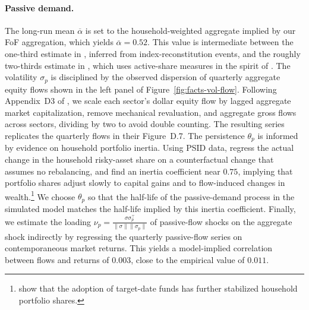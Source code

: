 \documentclass[12pt,english]{article}
\begin{document}
\paragraph{Passive demand.}
The long-run mean $\overline{\alpha}$ is set to the household-weighted aggregate implied by our FoF aggregation, which yields $\overline{\alpha}=0.52$.
This value is intermediate between the one-third estimate in \citet{chinco2024passive}, inferred from index-reconstitution events, and the roughly two-thirds estimate in \citet{koijen2024investors}, which uses active-share measures in the spirit of \citet{cremers2009active}.
The volatility $\sigma_p$ is disciplined by the observed dispersion of quarterly aggregate equity flows shown in the left panel of Figure~\ref{fig:facts-vol-flow}.
Following Appendix~D3 of \citet{gabaix2020search}, we scale each sector's dollar equity flow by lagged aggregate market capitalization, remove mechanical revaluation, and aggregate gross flows across sectors, dividing by two to avoid double counting.
The resulting series replicates the quarterly flows in their Figure~D.7.
The persistence $\theta_p$ is informed by evidence on household portfolio inertia.
Using PSID data, \citet{brunnermeier2008wealth} regress the actual change in the household risky-asset share on a counterfactual change that assumes no rebalancing, and find an inertia coefficient near $0.75$, implying that portfolio shares adjust slowly to capital gains and to flow-induced changes in wealth.\footnote{\citet{parker2023retail} show that the adoption of target-date funds has further stabilized household portfolio shares.}
We choose $\theta_p$ so that the half-life of the passive-demand process in the simulated model matches the half-life implied by this inertia coefficient.
Finally, we estimate the loading $\nu_p = \frac{\sigma \sigma_p^\top}{\|\sigma\| \|\sigma_p\|}$ of passive-flow shocks on the aggregate shock indirectly by regressing the quarterly passive-flow series on contemporaneous market returns.
This yields a model-implied correlation between flows and returns of $0.003$, close to the empirical value of $0.011$.

\begin{table}[!t]
    \centering
    \resizebox{.8\linewidth}{!}{}
    \vspace{2mm}
    \captionsetup{font=footnotesize}
    \caption{\textbf{Unconditional moments.}\\
    This table reports model-implied and empirical unconditional moments for the dividend claim and the endowment claim in the baseline economy.
    Model moments are computed from a $1{,}000$-year monthly simulation of the calibrated economy.
    The price impact is estimated as the slope coefficient $\hat{b}_1$ of the regression $\Delta\log(P/D)_t = a_0 + b_1\,\overline{\alpha}_{p,t}^{s}\,x_{p,t-1} + e_t$, where $\overline{\alpha}_{p,t}^{s}$ is the innovation to passive demand.
    Asset/Equity denotes the ratio of risky-asset holdings to equity for the constrained and unconstrained sectors; asset shares report the fraction of the aggregate risky market held by each sector.
    All values are annualized.}\label{tab:simulation_moments}
\end{table}
\end{document}
